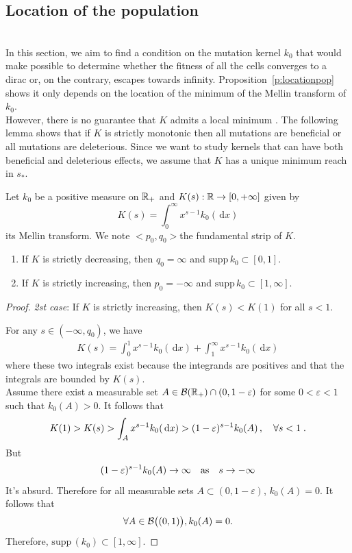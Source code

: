 \documentclass[11pt]{amsart}
\newcommand{\diff}{\,\mathrm{d}}
\newcommand{\supp}{\mathrm{supp}\,}
\begin{document}
\subsection{Location of the population}
\label{s:locationpop} \mbox{}\\
In this section, we aim to find a condition on the mutation kernel $k_0$ that would make possible to determine whether the fitness of all the cells converges to a dirac or, on the contrary, escapes towards infinity. Proposition~\ref{p:locationpop} shows it only depends on the location of the minimum of the Mellin transform of $k_0$. \\

However, there is no guarantee that $K$ admits a local minimum \cite{doumic2016time}. The following lemma shows that if $K$ is strictly monotonic then all mutations are beneficial or all mutations are deleterious. Since we want to study kernels that can have both beneficial and deleterious effects, we assume that $K$ has a unique minimum reach in $s_*$. 

\begin{lemma}Let $k_0$ be a positive measure on $\mathbb{R}_+$ and $K(s):\mathbb{R} \to [0,+\infty]$ given by $$K(s)=\int_0^\infty x^{s-1}k_0(\diff x)$$ its Mellin transform. We note $<p_0,q_0>$the fundamental strip of $K$.
\begin{enumerate}
    \item If $K$ is strictly decreasing, then $q_0 = \infty$ and  $\supp k_0 \subset [0,1]$.
    \item If $K$ is strictly increasing, then $p_0 = -\infty$ and $\supp k_0 \subset [1, \infty]$.
\end{enumerate}
\end{lemma}
\begin{proof}
\textit{2st case}: If $K$ is strictly increasing, then $K(s)<K(1)$ for all $s < 1$.


For any $s \in (-\infty, q_0)$, we have
\begin{align*}
    K(s) = \int_0^1 x^{s-1} k_0(\diff x) + \int_1^\infty x^{s-1} k_0(\diff x)
\end{align*}
where these two integrals exist because the integrands are positives and that the integrals are bounded by $K(s)$. \\

Assume there exist a measurable set $A \in \mathcal{B}(\mathbb{R}_+) \cap (0,1-\varepsilon)$ for some $0 < \varepsilon < 1$ such that $k_0(A) > 0$.  It follows that 
\begin{align*}
   K(1) > K(s) > \int_A x^{s-1} k_0(\diff x)
   > (1-\varepsilon)^{s-1} k_0(A)
   \,,\quad \forall s < 1
   \eqfinp
\end{align*}
But $$(1-\varepsilon)^{s-1} k_0(A) \to \infty \quad \text{as} \quad s \to -\infty$$
It's absurd. Therefore for all measurable sets $A \subset (0,1-\varepsilon)$, $k_0(A) = 0$. It follows that  
$$\forall A \in \mathcal{B}\big((0,1)\big), k_0(A) = 0.$$
Therefore, $\supp(k_0) \subset [1, \infty]$.
\end{proof}
\end{document}
